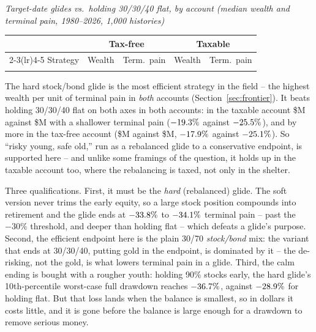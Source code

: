 \documentclass[11pt]{article}
\begin{document}
{\small
\begin{center}
\textit{Target-date glides vs.\ holding 30/30/40 flat, by account (median wealth and terminal pain,
1980--2026, 1{,}000 histories)}\\[2pt]
\begin{tabular}{@{}lrrrr@{}}
\toprule
 & \multicolumn{2}{c}{Tax-free} & \multicolumn{2}{c}{Taxable} \\
\cmidrule(lr){2-3}\cmidrule(lr){4-5}
Strategy & Wealth & Term.\ pain & Wealth & Term.\ pain \\
\midrule
\\
\bottomrule
\end{tabular}
\end{center}
}

\noindent The hard stock/bond glide is the most efficient strategy in the field -- the highest wealth
per unit of terminal pain in \emph{both} accounts (Section~\ref{sec:frontier}). It beats holding
30/30/40 flat on both axes in both accounts: in the taxable account \$\HardGlideTxWealth M against \$\FlatTxWealth M with a
shallower terminal pain ($-19.3\%$ against $-25.5\%$), and by more in the tax-free account (\$\HardGlideTfWealth M
against \$\FlatTfWealth M, $-17.9\%$ against $-25.1\%$). So ``risky
young, safe old,'' run as a rebalanced glide to a conservative endpoint, is supported here -- and unlike
some framings of the question, it holds up in the taxable account too, where the rebalancing is taxed,
not only in the shelter.

Three qualifications. First, it must be the \emph{hard} (rebalanced) glide. The soft version never
trims the early equity, so a large stock position compounds into retirement and the glide ends at
$-33.8\%$ to $-34.1\%$ terminal pain -- past the $-30\%$ threshold, and deeper than holding flat -- which
defeats a glide's purpose. Second, the efficient endpoint here is the plain 30/70 \emph{stock/bond}
mix: the variant that ends at 30/30/40, putting gold in the endpoint, is dominated by it -- the
de-risking, not the gold, is what lowers terminal pain in a glide. Third, the calm ending is bought
with a rougher youth: holding 90\% stocks early, the hard glide's 10th-percentile worst-case full
drawdown reaches $-36.7\%$, against $-28.9\%$ for holding flat. But that loss lands when the balance is
smallest, so in dollars it costs little, and it is gone before the balance is large enough for a
drawdown to remove serious money.
\end{document}

